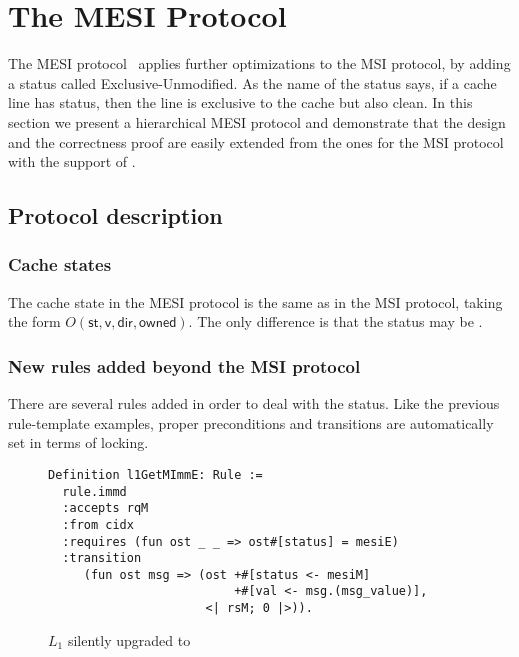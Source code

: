 \section{The MESI Protocol}
\label{sec-mesi-protocol}

The MESI protocol~\cite{Papamarcos:1984} applies further optimizations to the MSI protocol, by adding a status called Exclusive-Unmodified.
As the name of the status says, if a cache line has \stE{} status, then the line is exclusive to the cache but also clean.
In this section we present a hierarchical MESI protocol and demonstrate that the design and the correctness proof are easily extended from the ones for the MSI protocol with the support of \hemiola{}.

\subsection{Protocol description}
\label{sec-mesi-protocol-desc}

\subsubsection{Cache states}

The cache state in the MESI protocol is the same as in the MSI protocol, taking the form $O(\textsf{st}, \textsf{v}, \textsf{dir}, \textsf{owned})$.
The only difference is that the status may be \stE{}.

\subsubsection{New rules added beyond the MSI protocol}

There are several rules added in order to deal with the \stE{} status.
Like the previous rule-template examples, proper preconditions and transitions are automatically set in terms of locking.

\begin{figure}[h]
  \centering
\begin{lstlisting}
Definition l1GetMImmE: Rule :=
  rule.immd
  :accepts rqM
  :from cidx
  :requires (fun ost _ _ => ost#[status] = mesiE)
  :transition
     (fun ost msg => (ost +#[status <- mesiM]
                          +#[val <- msg.(msg_value)],
                      <| rsM; 0 |>)).
\end{lstlisting}
  \caption{$L_1$ silently upgraded to \stM{}}
  \label{fig-rule-l1-silent-upgrade}
\end{figure}

